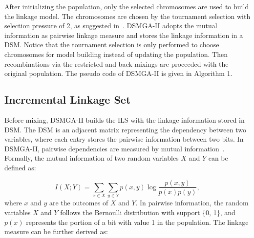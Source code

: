 After initializing the population, only the selected chromosomes are used to build the linkage model. 
The chromosomes are chosen by the tournament selection with selection pressure of 2, as suggested in~\cite{yu:population}. 
DSMGA-II adopts the mutual information as pairwise linkage measure and stores the linkage information in a DSM. 
Notice that the tournament selection is only performed to choose chromosomes for model building instead of updating the population. 
Then recombinations via the restricted and back mixings are proceeded with the original population. 
The pseudo code of DSMGA-II is given in Algorithm 1.



\subsection{Incremental Linkage Set}
Before mixing, DSMGA-II builds the ILS with the linkage information stored in DSM. 
The DSM is an adjacent matrix representing the dependency between two variables, where each entry stores the pairwise information between two bits. 
In DSMGA-II, pairwise dependencies are measured by mutual information~\cite{kullback:KL-diversion}. 
Formally, the mutual information of two random variables $X$ and $Y$ can be defined as:

\begin{displaymath} 
I(X;Y) = \sum_{x \in X}\sum_{y \in Y} p(x,y)  \log{ \frac{p(x,y)}{p(x) p(y)} }, 
\end{displaymath}
where $x$ and $y$ are the outcomes of $X$ and $Y$. 
In pairwise information, the random variables $X$ and $Y$ follows the Bernoulli distribution with support \{0, 1\}, and $p(x)$ represents the portion of a bit with value 1 in the population. 
The linkage measure can be further derived as:

